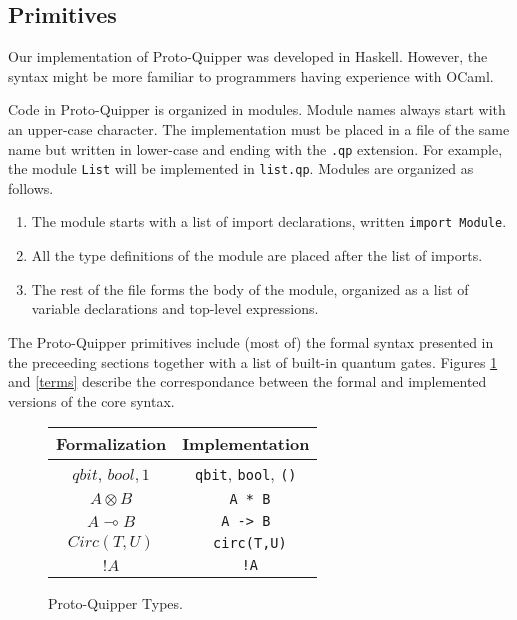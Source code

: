 \subsection{Primitives}

Our implementation of Proto-Quipper was developed in Haskell. However, the 
syntax might be more familiar to programmers having experience with OCaml.

Code in Proto-Quipper is organized in modules. Module names always start 
with an upper-case character. The implementation must be placed in a file 
of the same name but written in lower-case and ending with the {\tt.qp} 
extension. For example, the module {\tt List} will be implemented in 
{\tt list.qp}. Modules are organized as follows.
\begin{enumerate}
  \item The module starts with a list of import declarations, written 
  {\tt import Module}.
  \item All the type definitions of the module are placed after the list 
  of imports.
  \item The rest of the file forms the body of the module, organized as a 
  list of variable declarations and top-level expressions.
\end{enumerate}

The Proto-Quipper primitives include (most of) the formal syntax presented 
in the preceeding sections together with a list of built-in quantum gates. 
Figures \hyperref[types]{\ref*{types}} and \hyperref[terms]{\ref*{terms}} 
describe the correspondance between the formal and implemented versions of 
the core syntax.

\begin{figure}[!ht]
\begin{center}
\renewcommand{\arraystretch}{1.4}
\begin{tabular}{|c|c|}
  \hline
  \textbf{Formalization}    & \textbf{Implementation} \\\hline
  $qbit$, $bool, 1$         & \verb#qbit#, \verb#bool#, \verb#()# \\\hline
  $A \otimes B$             & \verb# A * B# \\\hline
  $A \multimap B$           & \verb# A -> B # \\\hline
  $Circ(T, U)$              & \verb# circ(T,U)# \\\hline
  ${!} A$                   & \verb# !A# \\\hline
\end{tabular}
\end{center}
\caption{Proto-Quipper Types.}
\label{types}
\end{figure}

